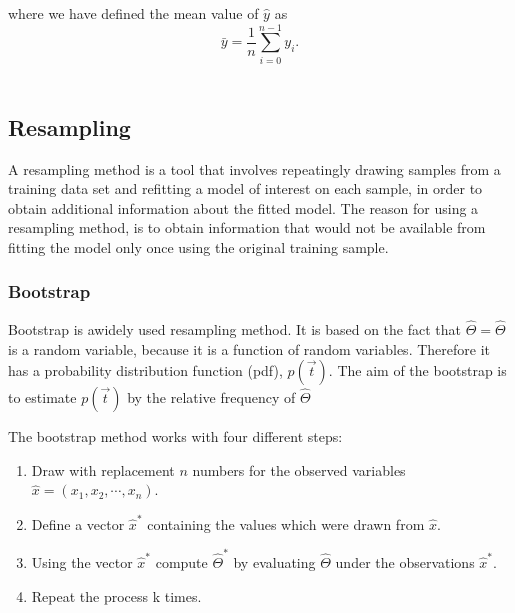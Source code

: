 where we have defined the mean value  of $\hat{y}$ as
\begin{equation}
\bar{y} =  \frac{1}{n} \sum_{i=0}^{n - 1} y_i.
\end{equation}~\cite{Project1}

\subsection{Resampling}
A resampling method is a tool that involves 
repeatingly drawing samples from a training data set and refitting a model
of interest on each sample, in order to obtain additional information 
about the fitted model. 
The reason for using a resampling method, is to obtain information that would
not be available from fitting the model only once using the original training
sample. ~\cite{LectureNotes-FysStk}

\subsubsection{Bootstrap}\label{sec:bootstrap}
Bootstrap is awidely used resampling method.
It is based on the fact that \(\hat{\Theta} = \hat{\Theta}\)
is a random variable, because it is a function of random variables. 
Therefore it has a probability distribution function (pdf), \(p(\vec{t})\). The aim of the bootstrap is to 
estimate \(p(\vec{t})\) by the relative frequency of \(\hat{\Theta}\)
~\cite{LectureNotes-FysStk}

The bootstrap method works with four different steps: 
\begin{enumerate}
		\item Draw with replacement \(n\) numbers for the observed variables
			\(\hat{x} = (x_1, x_2,\cdots, x_n)\).
		\item Define a vector \(\hat{x}^*\) containing the values which were 
			drawn from \(\hat{x}\). 
		\item Using the vector \(\hat{x}^*\) compute \(\hat{\Theta}^*\)
			by evaluating \(\hat{\Theta}\) under the observations 
			\(\hat{x}^*\).
		\item Repeat the process k times. 
\end{enumerate} 
~\cite{LectureNotes-FysStk}
